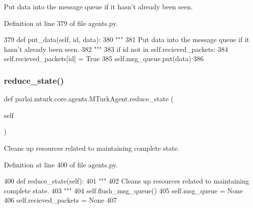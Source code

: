 \begin{DoxyVerb}Put data into the message queue if it hasn't already been seen.
\end{DoxyVerb}
 

Definition at line 379 of file agents.\+py.


\begin{DoxyCode}
379     \textcolor{keyword}{def }put\_data(self, id, data):
380         \textcolor{stringliteral}{"""}
381 \textcolor{stringliteral}{        Put data into the message queue if it hasn't already been seen.}
382 \textcolor{stringliteral}{        """}
383         \textcolor{keywordflow}{if} id \textcolor{keywordflow}{not} \textcolor{keywordflow}{in} self.recieved\_packets:
384             self.recieved\_packets[id] = \textcolor{keyword}{True}
385             self.msg\_queue.put(data)
386 
\end{DoxyCode}
\mbox{\label{classparlai_1_1mturk_1_1core_1_1agents_1_1MTurkAgent_aa5dd2f607442909921b3108b416460b3}} 
\subsubsection{\texorpdfstring{reduce\+\_\+state()}{reduce\_state()}}
{\footnotesize\ttfamily def parlai.\+mturk.\+core.\+agents.\+M\+Turk\+Agent.\+reduce\+\_\+state (\begin{DoxyParamCaption}\item[{}]{self }\end{DoxyParamCaption})}

\begin{DoxyVerb}Cleans up resources related to maintaining complete state.
\end{DoxyVerb}
 

Definition at line 400 of file agents.\+py.


\begin{DoxyCode}
400     \textcolor{keyword}{def }reduce\_state(self):
401         \textcolor{stringliteral}{"""}
402 \textcolor{stringliteral}{        Cleans up resources related to maintaining complete state.}
403 \textcolor{stringliteral}{        """}
404         self.flush\_msg\_queue()
405         self.msg\_queue = \textcolor{keywordtype}{None}
406         self.recieved\_packets = \textcolor{keywordtype}{None}
407 
\end{DoxyCode}
\mbox{\label{classparlai_1_1mturk_1_1core_1_1agents_1_1MTurkAgent_a88473ff128e7a40c59711d35eab97a0b}} 
